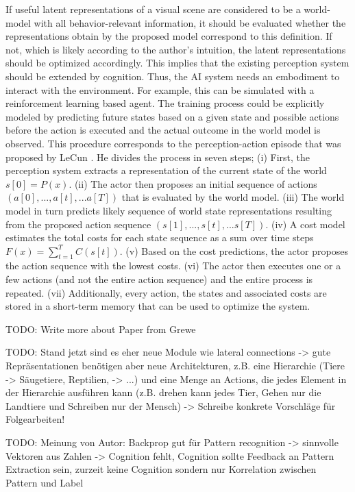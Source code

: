If useful latent representations of a visual scene are considered to be a world-model with all behavior-relevant information, it should be evaluated whether the representations obtain by the proposed model correspond to this definition.
If not, which is likely according to the author's intuition, the latent representations should be optimized accordingly.
This implies that the existing perception system should be extended by cognition.
Thus, the AI system needs an embodiment to interact with the environment.
For example, this can be simulated with a reinforcement learning based agent.
The training process could be explicitly modeled by predicting future states based on a given state and possible actions before the action is executed and the actual outcome in the world model is observed.
This procedure corresponds to the perception-action episode that was proposed by LeCun .
He divides the process in seven steps;
(i) First, the perception system extracts a representation of the current state of the world \(s[0]=P(x)\). (ii) The actor then proposes an initial sequence of actions \((a[0], ..., a[t], ... a[T])\) that is evaluated by the world model. (iii) The world model in turn predicts likely sequence of world state representations resulting from the proposed action sequence \((s[1], ..., s[t], ... s[T])\). (iv) A cost model estimates the total costs for each state sequence as a sum over time steps \(F(x)=\sum_{t=1}^{T}C(s[t])\). (v) Based on the cost predictions, the actor proposes the action sequence with the lowest costs. (vi) The actor then executes one or a few actions (and not the entire action sequence) and the entire process is repeated. (vii) Additionally, every action, the states and associated costs are stored in a short-term memory that can be used to optimize the system.

TODO: Write more about Paper from Grewe 


TODO: Stand jetzt sind es eher neue Module wie lateral connections -> gute Repräsentationen benötigen aber neue Architekturen, z.B. eine Hierarchie (Tiere -> Säugetiere, Reptilien, -> ...) und eine Menge an Actions, die jedes Element in der Hierarchie ausführen kann (z.B. drehen kann jedes Tier, Gehen nur die Landtiere und Schreiben nur der Mensch) -> Schreibe konkrete Vorschläge für Folgearbeiten!


TODO: Meinung von Autor: Backprop gut für Pattern recognition -> sinnvolle Vektoren aus Zahlen -> Cognition fehlt, Cognition sollte Feedback an Pattern Extraction sein, zurzeit keine Cognition sondern nur Korrelation zwischen Pattern und Label
